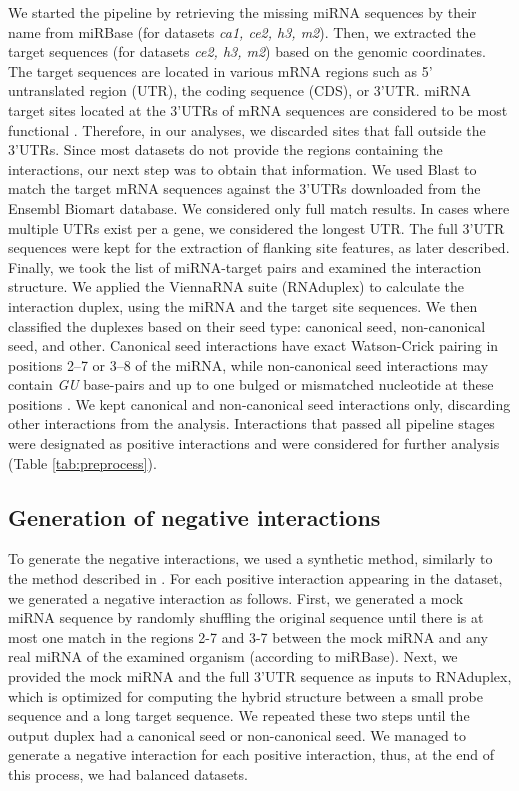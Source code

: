 \documentclass{bmcart}
\begin{document}
We started the pipeline by retrieving the missing miRNA sequences by their name from miRBase (for datasets  \textit{ca1, ce2, h3, m2}). Then, we extracted the target sequences (for datasets \textit{ce2, h3, m2}) based on the genomic coordinates. The target sequences are located in various mRNA regions such as 5' untranslated region (UTR), the coding sequence (CDS), or 3'UTR. miRNA target sites located at the 3'UTRs of mRNA sequences are considered to be most functional \cite{menor2014mirmark, baek2008impact}. Therefore, in our analyses, we discarded sites that fall outside the 3'UTRs. Since most datasets do not provide the regions containing the interactions, our next step was to obtain that information. We used Blast \cite{altschul1990basic_blast} to match the target mRNA sequences against the 3'UTRs downloaded from the Ensembl Biomart database. We considered only full match results. In cases where multiple UTRs exist per a gene, we considered the longest UTR. The full 3'UTR sequences were kept for the extraction of flanking site features, as later described. Finally, we took the list of miRNA-target pairs and examined the interaction structure. We applied the ViennaRNA suite (RNAduplex) \cite{lorenz2011viennarna} to calculate the interaction duplex, using the miRNA and the target site sequences. We then classified the duplexes based on their seed type: canonical seed, non-canonical seed, and other. Canonical seed interactions have exact Watson-Crick pairing in positions 2–7 or 3–8 of the miRNA, while non-canonical seed interactions may contain \textit{GU} base-pairs and up to one bulged or mismatched nucleotide at these positions \cite{helwak2013mapping}. We kept canonical and non-canonical seed interactions only, discarding other interactions from the analysis.
Interactions that passed all pipeline stages were designated as positive interactions and were considered for further analysis (Table \ref{tab:preprocess}).



\subsection*{Generation of negative interactions}
To generate the negative interactions, we used a synthetic method, similarly to the method described in \cite{menor2014mirmark, john2004human, maragkakis2009accurate}. For each positive interaction appearing in the dataset, we generated a negative interaction as follows. First, we generated a mock miRNA sequence by randomly shuffling the original sequence until there is at most one match in the regions 2-7 and 3-7 between the mock miRNA and any real miRNA of the examined organism (according to miRBase). Next, we provided the mock miRNA and the full 3'UTR sequence as inputs to RNAduplex, which is optimized for computing the hybrid structure between a small probe sequence and a long target sequence. We repeated these two steps until the output duplex had a canonical seed or non-canonical seed. 
We managed to generate a negative interaction for each positive interaction, thus, at the end of this process, we had balanced datasets.
\end{document}
